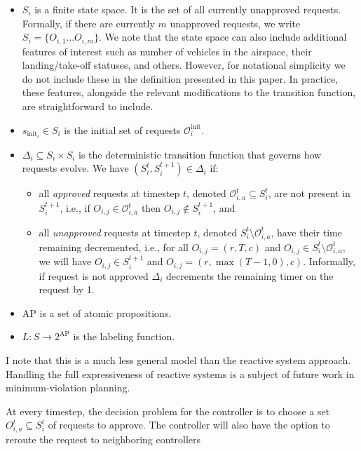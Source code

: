 \begin{itemize}
    \item $S_i$ is a finite state space.  It is the set of all currently unapproved requests. Formally, if there are currently $m$ unapproved requests, we write $S_i = \{O_{i,1} \dots O_{i,m}\}$. We note that the state space can also include additional features of interest such as number of vehicles in the airspace, their landing/take-off statuses, and others. However, for notational simplicity we do not include these in the definition presented in this paper. In practice, these features, alongside the relevant modifications to the transition function, are straightforward to include. 
    \item $s_{\text{init}_i} \in S_i$ is the initial set of requests $\mathcal{O}^{\text{init}}_i$.
    \item $\Delta_i \subseteq S_i \times S_i$ is the deterministic transition function that governs how requests evolve. We have $\left(S^t_i,S^{t+1}_i \right) \in \Delta_i$ if:

    \begin{itemize}
        \item all \emph{approved} requests at timestep $t$, denoted $\mathcal O_{i,a}^t \subseteq S^t_i$,  are not present in $S^{t+1}_i$, i.e., if $O_{i,j} \in  \mathcal O_{i,a}^t$ then $O_{i,j} \notin S^{t+1}_i$, and
        \item all \emph{unapproved} requests at timestep $t$, denoted $S^{t}_i \setminus \mathcal O_{i,a}^t$, have their time remaining decremented, i.e., for all $O_{i,j} = (r,T,c)$ and $O_{i,j} \in S^{t}_i \setminus \mathcal{O}_{i,a}^t$, we will have $O_{i,j} \in S^{t+1}_i$ and $O_{i,j} = (r,\max(T-1,0),c)$. Informally, if request is not approved $\Delta_i$ decrements the remaining timer on the request by 1. 
    \end{itemize}
    \item $\text{AP}$ is a set of atomic propositions.
    \item  $L:S\rightarrow 2^{\text{AP}}$ is the labeling function.
\end{itemize}

I note that this is a much less general model than the reactive system approach. Handling the full expressiveness of reactive systems is a subject of future work in minimum-violation planning. 

At every timestep, the decision problem for the controller is to choose a set $O_{i,a}^t \subseteq S^{t}_i$ of requests to approve. The controller will also have the option to reroute the request to neighboring controllers

